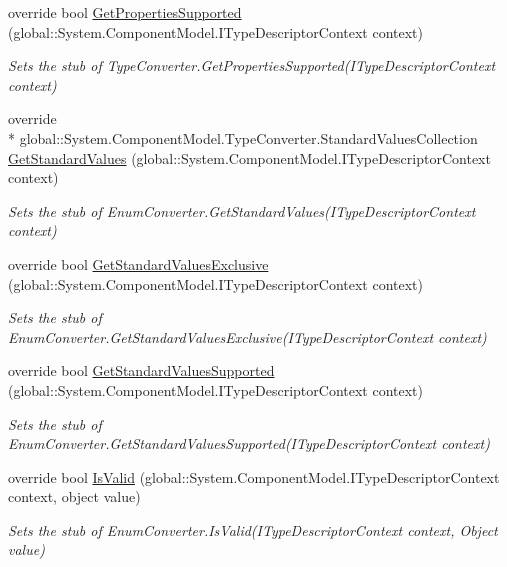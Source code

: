 \begin{DoxyCompactItemize}
override bool \hyperlink{class_system_1_1_component_model_1_1_fakes_1_1_stub_enum_converter_a5e6267f1e7c870269c59b5b21b5a541c}{Get\-Properties\-Supported} (global\-::\-System.\-Component\-Model.\-I\-Type\-Descriptor\-Context context)
\begin{DoxyCompactList}\small\item\em Sets the stub of Type\-Converter.\-Get\-Properties\-Supported(\-I\-Type\-Descriptor\-Context context)\end{DoxyCompactList}\item 
override \\*
global\-::\-System.\-Component\-Model.\-Type\-Converter.\-Standard\-Values\-Collection \hyperlink{class_system_1_1_component_model_1_1_fakes_1_1_stub_enum_converter_a4cb4eea556eca2d76a582a2dd4fdf0da}{Get\-Standard\-Values} (global\-::\-System.\-Component\-Model.\-I\-Type\-Descriptor\-Context context)
\begin{DoxyCompactList}\small\item\em Sets the stub of Enum\-Converter.\-Get\-Standard\-Values(\-I\-Type\-Descriptor\-Context context)\end{DoxyCompactList}\item 
override bool \hyperlink{class_system_1_1_component_model_1_1_fakes_1_1_stub_enum_converter_aecd8a5a83032477a19463f0f11548ab2}{Get\-Standard\-Values\-Exclusive} (global\-::\-System.\-Component\-Model.\-I\-Type\-Descriptor\-Context context)
\begin{DoxyCompactList}\small\item\em Sets the stub of Enum\-Converter.\-Get\-Standard\-Values\-Exclusive(\-I\-Type\-Descriptor\-Context context)\end{DoxyCompactList}\item 
override bool \hyperlink{class_system_1_1_component_model_1_1_fakes_1_1_stub_enum_converter_a43cc9f7388bc47bdd454d346f68c403a}{Get\-Standard\-Values\-Supported} (global\-::\-System.\-Component\-Model.\-I\-Type\-Descriptor\-Context context)
\begin{DoxyCompactList}\small\item\em Sets the stub of Enum\-Converter.\-Get\-Standard\-Values\-Supported(\-I\-Type\-Descriptor\-Context context)\end{DoxyCompactList}\item 
override bool \hyperlink{class_system_1_1_component_model_1_1_fakes_1_1_stub_enum_converter_aa82ff4666a6952ba4e38fa4cab823903}{Is\-Valid} (global\-::\-System.\-Component\-Model.\-I\-Type\-Descriptor\-Context context, object value)
\begin{DoxyCompactList}\small\item\em Sets the stub of Enum\-Converter.\-Is\-Valid(\-I\-Type\-Descriptor\-Context context, Object value)\end{DoxyCompactList}\end{DoxyCompactItemize}
